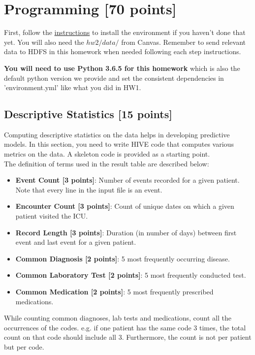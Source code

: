 \documentclass[12pt]{article}
\begin{document}
\section{Programming [70 points]}
First, follow the \href{http://www.sunlab.org/teaching/cse6250/fall2018/env/}{instructions} to install the environment if you haven't done that yet. You will also need the $hw2/data/$ from Canvas. Remember to send relevant data to HDFS in this homework when needed following each step instructions.

\textbf{You will need to use Python 3.6.5 for this homework} which is also the default python version we provide and set the consistent dependencies in 'environment.yml' like what you did in HW1. 


\subsection{Descriptive Statistics [15 points]}
Computing descriptive statistics on the data helps in developing predictive models. In this section, you need to write HIVE code that computes various metrics on the data. A skeleton code is provided as a starting point. \\

The definition of terms used in the result table are described below:
\begin{itemize}
\item \textbf{Event Count [3 points]}: Number of events recorded for a given patient. Note that every line in the input file is an event. 
\item \textbf{Encounter Count [3 points]}: Count of unique dates on which a given patient visited the ICU.
\item \textbf{Record Length [3 points]}: Duration (in number of days) between first event and last event for a given patient.
\item \textbf{Common Diagnosis [2 points]}: 5 most frequently occurring disease.
\item \textbf{Common Laboratory Test [2 points]}: 5 most frequently conducted test.
\item \textbf{Common Medication [2 points]}: 5 most frequently prescribed medications.
\end{itemize}
While counting common diagnoses, lab tests and medications, count all the occurrences of the codes. e.g. if one patient has the same code 3 times, the total count on that code should include all 3. Furthermore, the count is not per patient but per code.
\end{document}
